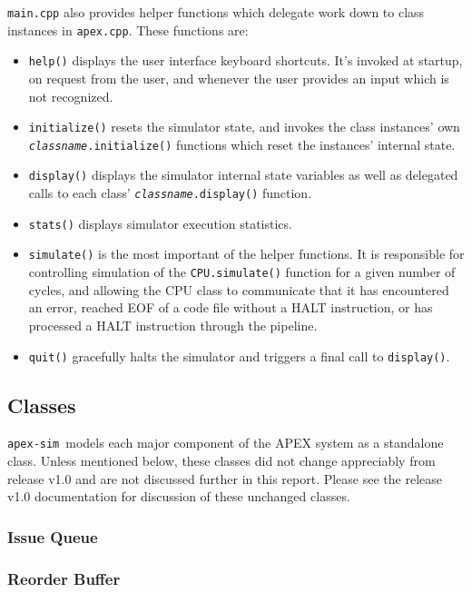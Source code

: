 \documentclass[12pt]{article}
\newcommand{\codename}[0]{\texttt{apex-sim}~}
\begin{document}
\texttt{main.cpp} also provides helper functions which delegate work down to class instances in \texttt{apex.cpp}. These functions are:
\begin{itemize}
  \item \texttt{help()} displays the user interface keyboard shortcuts. It's invoked at startup, on request from the user, and whenever the user provides an input which is not recognized.
  \item \texttt{initialize()} resets the simulator state, and invokes the class instances' own \texttt{\textit{classname}.initialize()} functions which reset the instances' internal state.
  \item \texttt{display()} displays the simulator internal state variables as well as delegated calls to each class' \texttt{\textit{classname}.display()} function.
  \item \texttt{stats()} displays simulator execution statistics.
  \item \texttt{simulate()} is the most important of the helper functions. It is responsible for controlling simulation of the \texttt{CPU.simulate()} function for a given number of cycles, and allowing the CPU class to communicate that it has encountered an error, reached EOF of a code file without a HALT instruction, or has processed a HALT instruction through the pipeline.
  \item \texttt{quit()} gracefully halts the simulator and triggers a final call to \texttt{display()}.
\end{itemize}

\subsection{Classes}
\label{sec:classes}
\codename models each major component of the APEX system as a standalone class. Unless mentioned below, these classes did not change appreciably from release v1.0 and are not discussed further in this report. Please see the release v1.0 documentation for discussion of these unchanged classes.

\subsubsection{Issue Queue}

\subsubsection{Reorder Buffer}
\end{document}
